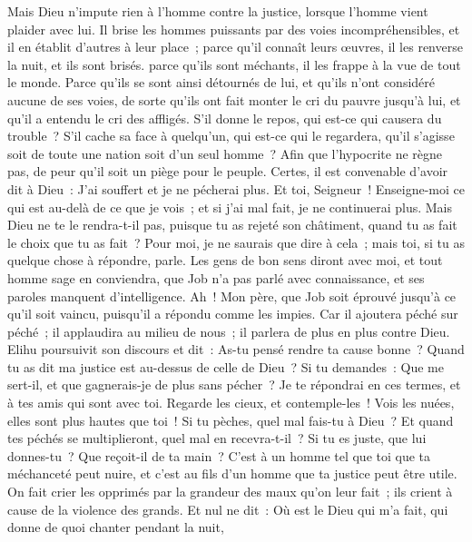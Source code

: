 \begin{multicols}{2}
Mais Dieu n'impute rien à l'homme contre la justice, lorsque l'homme vient plaider avec lui.
Il brise les hommes puissants par des voies incompréhensibles, et il en établit d'autres à leur place~;
parce qu'il connaît leurs œuvres, il les renverse la nuit, et ils sont brisés.
parce qu'ils sont méchants, il les frappe à la vue de tout le monde.
Parce qu'ils se sont ainsi détournés de lui, et qu'ils n'ont considéré aucune de ses voies,
de sorte qu'ils ont fait monter le cri du pauvre jusqu'à lui, et qu'il a entendu le cri des affligés.
S'il donne le repos, qui est-ce qui causera du trouble~? S'il cache sa face à quelqu'un, qui est-ce qui le regardera, qu'il s'agisse soit de toute une nation soit d'un seul homme~?
Afin que l'hypocrite ne règne pas, de peur qu'il soit un piège pour le peuple.
Certes, il est convenable d'avoir dit à Dieu~: J'ai souffert et je ne pécherai plus.
Et toi, Seigneur~! Enseigne-moi ce qui est au-delà de ce que je vois~; et si j'ai mal fait, je ne continuerai plus.
Mais Dieu ne te le rendra-t-il pas, puisque tu as rejeté son châtiment, quand tu as fait le choix que tu as fait~? Pour moi, je ne saurais que dire à cela~; mais toi, si tu as quelque chose à répondre, parle.
Les gens de bon sens diront avec moi, et tout homme sage en conviendra,
que Job n'a pas parlé avec connaissance, et ses paroles manquent d'intelligence.
Ah~! Mon père, que Job soit éprouvé jusqu'à ce qu'il soit vaincu, puisqu'il a répondu comme les impies.
Car il ajoutera péché sur péché~; il applaudira au milieu de nous~; il parlera de plus en plus contre Dieu.
\VerseOne{}Elihu poursuivit son discours et dit~:
As-tu pensé rendre ta cause bonne~? Quand tu as dit ma justice est au-dessus de celle de Dieu~?
Si tu demandes~: Que me sert-il, et que gagnerais-je de plus sans pécher~?
Je te répondrai en ces termes, et à tes amis qui sont avec toi.
Regarde les cieux, et contemple-les~! Vois les nuées, elles sont plus hautes que toi~!
Si tu pèches, quel mal fais-tu à Dieu~? Et quand tes péchés se multiplieront, quel mal en recevra-t-il~?
Si tu es juste, que lui donnes-tu~? Que reçoit-il de ta main~?
C'est à un homme tel que toi que ta méchanceté peut nuire, et c'est au fils d'un homme que ta justice peut être utile.
On fait crier les opprimés par la grandeur des maux qu'on leur fait~; ils crient à cause de la violence des grands.
Et nul ne dit~: Où est le Dieu qui m'a fait, qui donne de quoi chanter pendant la nuit,

\end{multicols}
